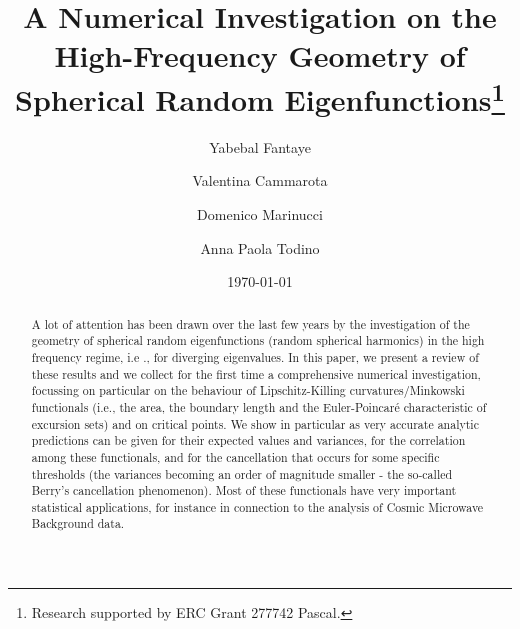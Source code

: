 \documentclass[aps,prd,showpacs,superscriptaddress,groupedaddress]{revtex4-1}  %
\begin{document}
\title{A Numerical Investigation on the High-Frequency Geometry of Spherical Random Eigenfunctions\thanks{%
Research supported by ERC Grant 277742 Pascal.}}
\author{Yabebal Fantaye}
\author{Valentina Cammarota}
\author{Domenico Marinucci}
\author{Anna Paola Todino}



\date{\today}



\begin{abstract}
A lot of attention has been drawn over the last few years by the investigation of the geometry of spherical random eigenfunctions (random spherical harmonics) in the high frequency regime, i.e ., for diverging eigenvalues. In this paper, we present a review of these results and we collect for the first time a comprehensive numerical investigation, focussing on particular on the behaviour of Lipschitz-Killing curvatures/Minkowski functionals (i.e., the area, the boundary length and the Euler-Poincar\'e characteristic of excursion sets) and on critical points. We show in particular as very accurate analytic predictions can be given for their expected values and variances, for the correlation among these functionals, and for the cancellation that occurs for some specific thresholds (the variances becoming an order of magnitude smaller - the so-called Berry's cancellation phenomenon). Most of these functionals have very important statistical applications, for instance in connection to the analysis of Cosmic Microwave Background data.
\end{abstract}




\maketitle
\end{document}
